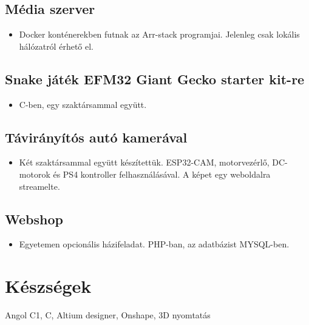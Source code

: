 \documentclass{article}
\begin{document}
\subsection{Média szerver}
\begin{itemize}
  \item Docker konténerekben futnak az Arr-stack programjai. Jelenleg csak lokális hálózatról érhető el.
\end{itemize}

\subsection{Snake játék EFM32 Giant Gecko starter kit-re}
\begin{itemize}
  \item C-ben, egy szaktársammal együtt.
\end{itemize}

\subsection{Távirányítós autó kamerával}
\begin{itemize}
  \item Két szaktársammal együtt készítettük. ESP32-CAM, motorvezérlő, DC-motorok és PS4 kontroller felhasználásával. A képet egy weboldalra streamelte.
\end{itemize}

\subsection{Webshop}
\begin{itemize}
  \item Egyetemen opcionális házifeladat. PHP-ban, az adatbázist MYSQL-ben.
\end{itemize}

\section{\faCogs\enspace Készségek}
\begin{description}
  \item Angol C1, C, Altium designer, Onshape, 3D nyomtatás
\end{description}
\end{document}
